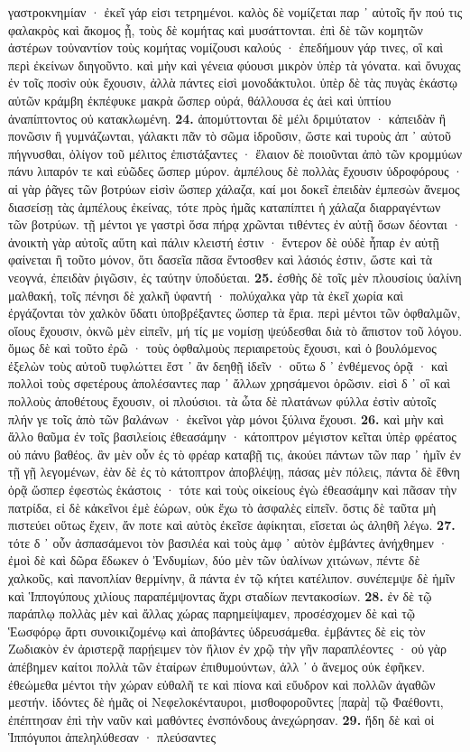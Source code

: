 \documentclass[a4paper, 11pt, oneside, polutonikogreek, german]{article}
\begin{document}
γαστροκνημίαν · ἐκεῖ γάρ εἰσι τετρημένοι. καλὸς δὲ νομίζεται παρ ᾽ αὐτοῖς ἤν πού τις φαλακρὸς καὶ ἄκομος ᾖ, τοὺς δὲ κομήτας καὶ μυσάττονται. ἐπὶ δὲ τῶν κομητῶν ἀστέρων τοὐναντίον τοὺς κομήτας νομίζουσι καλούς · ἐπεδήμουν γάρ τινες, οἳ καὶ περὶ ἐκείνων διηγοῦντο. καὶ μὴν καὶ γένεια φύουσι μικρὸν ὑπὲρ τὰ γόνατα. καὶ ὄνυχας ἐν τοῖς ποσὶν οὐκ ἔχουσιν, ἀλλὰ πάντες εἰσὶ μονοδάκτυλοι. ὑπὲρ δὲ τὰς πυγὰς ἑκάστῳ αὐτῶν κράμβη ἐκπέφυκε μακρὰ ὥσπερ οὐρά, θάλλουσα ἐς ἀεὶ καὶ ὑπτίου ἀναπίπτοντος οὐ κατακλωμένη. \textbf{24.} ἀπομύττονται δὲ μέλι δριμύτατον · κἀπειδὰν ἢ πονῶσιν ἢ γυμνάζωνται, γάλακτι πᾶν τὸ σῶμα ἱδροῦσιν, ὥστε καὶ τυροὺς ἀπ ᾽ αὐτοῦ πήγνυσθαι, ὀλίγον τοῦ μέλιτος ἐπιστάξαντες · ἔλαιον δὲ ποιοῦνται ἀπὸ τῶν κρομμύων πάνυ λιπαρόν τε καὶ εὐῶδες ὥσπερ μύρον. ἀμπέλους δὲ πολλὰς ἔχουσιν ὑδροφόρους · αἱ γὰρ ῥᾶγες τῶν βοτρύων εἰσὶν ὥσπερ χάλαζα, καί μοι δοκεῖ ἐπειδὰν ἐμπεσὼν ἄνεμος διασείσῃ τὰς ἀμπέλους ἐκείνας, τότε πρὸς ἡμᾶς καταπίπτει ἡ χάλαζα διαρραγέντων τῶν βοτρύων. τῇ μέντοι γε γαστρὶ ὅσα πήρᾳ χρῶνται τιθέντες ἐν αὐτῇ ὅσων δέονται · ἀνοικτὴ γὰρ αὐτοῖς αὕτη καὶ πάλιν κλειστή ἐστιν · ἔντερον δὲ οὐδὲ ἧπαρ ἐν αὐτῇ φαίνεται ἢ τοῦτο μόνον, ὅτι δασεῖα πᾶσα ἔντοσθεν καὶ λάσιός ἐστιν, ὥστε καὶ τὰ νεογνά, ἐπειδὰν ῥιγῶσιν, ἐς ταύτην ὑποδύεται. \textbf{25.} ἐσθὴς δὲ τοῖς μὲν πλουσίοις ὑαλίνη μαλθακή, τοῖς πένησι δὲ χαλκῆ ὑφαντή · πολύχαλκα γὰρ τὰ ἐκεῖ χωρία καὶ ἐργάζονται τὸν χαλκὸν ὕδατι ὑποβρέξαντες ὥσπερ τὰ ἔρια. περὶ μέντοι τῶν ὀφθαλμῶν, οἵους ἔχουσιν, ὀκνῶ μὲν εἰπεῖν, μή τίς με νομίσῃ ψεύδεσθαι διὰ τὸ ἄπιστον τοῦ λόγου. ὅμως δὲ καὶ τοῦτο ἐρῶ · τοὺς ὀφθαλμοὺς περιαιρετοὺς ἔχουσι, καὶ ὁ βουλόμενος ἐξελὼν τοὺς αὐτοῦ τυφλώττει ἔστ ᾽ ἂν δεηθῇ ἰδεῖν · οὕτω δ ᾽ ἐνθέμενος ὁρᾷ · καὶ πολλοὶ τοὺς σφετέρους ἀπολέσαντες παρ ᾽ ἄλλων χρησάμενοι ὁρῶσιν. εἰσὶ δ ᾽ οἳ καὶ πολλοὺς ἀποθέτους ἔχουσιν, οἱ πλούσιοι. τὰ ὦτα δὲ πλατάνων φύλλα ἐστὶν αὐτοῖς πλήν γε τοῖς ἀπὸ τῶν βαλάνων · ἐκεῖνοι γὰρ μόνοι ξύλινα ἔχουσι. \textbf{26.} καὶ μὴν καὶ ἄλλο θαῦμα ἐν τοῖς βασιλείοις ἐθεασάμην · κάτοπτρον μέγιστον κεῖται ὑπὲρ φρέατος οὐ πάνυ βαθέος. ἂν μὲν οὖν ἐς τὸ φρέαρ καταβῇ τις, ἀκούει πάντων τῶν παρ ᾽ ἡμῖν ἐν τῇ γῇ λεγομένων, ἐὰν δὲ ἐς τὸ κάτοπτρον ἀποβλέψῃ, πάσας μὲν πόλεις, πάντα δὲ ἔθνη ὁρᾷ ὥσπερ ἐφεστὼς ἑκάστοις · τότε καὶ τοὺς οἰκείους ἐγὼ ἐθεασάμην καὶ πᾶσαν τὴν πατρίδα, εἰ δὲ κἀκεῖνοι ἐμὲ ἑώρων, οὐκ ἔχω τὸ ἀσφαλὲς εἰπεῖν. ὅστις δὲ ταῦτα μὴ πιστεύει οὕτως ἔχειν, ἄν ποτε καὶ αὐτὸς ἐκεῖσε ἀφίκηται, εἴσεται ὡς ἀληθῆ λέγω. \textbf{27.} τότε δ ᾽ οὖν ἀσπασάμενοι τὸν βασιλέα καὶ τοὺς ἀμφ ᾽ αὐτὸν ἐμβάντες ἀνήχθημεν · ἐμοὶ δὲ καὶ δῶρα ἔδωκεν ὁ Ἐνδυμίων, δύο μὲν τῶν ὑαλίνων χιτώνων, πέντε δὲ χαλκοῦς, καὶ πανοπλίαν θερμίνην, ἃ πάντα ἐν τῷ κήτει κατέλιπον. συνέπεμψε δὲ ἡμῖν καὶ Ἱππογύπους χιλίους παραπέμψοντας ἄχρι σταδίων πεντακοσίων. \textbf{28.} ἐν δὲ τῷ παράπλῳ πολλὰς μὲν καὶ ἄλλας χώρας παρημείψαμεν, προσέσχομεν δὲ καὶ τῷ Ἑωσφόρῳ ἄρτι συνοικιζομένῳ καὶ ἀποβάντες ὑδρευσάμεθα. ἐμβάντες δὲ εἰς τὸν Ζωδιακὸν ἐν ἀριστερᾷ παρῄειμεν τὸν ἥλιον ἐν χρῷ τὴν γῆν παραπλέοντες · οὐ γὰρ ἀπέβημεν καίτοι πολλὰ τῶν ἑταίρων ἐπιθυμούντων, ἀλλ ᾽ ὁ ἄνεμος οὐκ ἐφῆκεν. ἐθεώμεθα μέντοι τὴν χώραν εὐθαλῆ τε καὶ πίονα καὶ εὔυδρον καὶ πολλῶν ἀγαθῶν μεστήν. ἰδόντες δὲ ἡμᾶς οἱ Νεφελοκένταυροι, μισθοφοροῦντες [παρὰ] τῷ Φαέθοντι, ἐπέπτησαν ἐπὶ τὴν ναῦν καὶ μαθόντες ἐνσπόνδους ἀνεχώρησαν. \textbf{29.} ἤδη δὲ καὶ οἱ Ἱππόγυποι ἀπεληλύθεσαν · πλεύσαντες 
\end{document}
